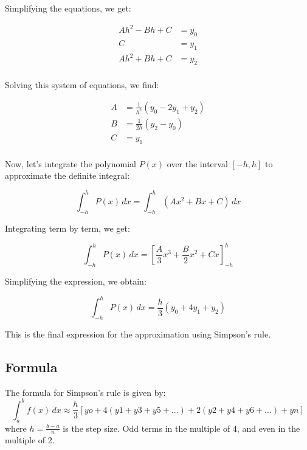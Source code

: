\documentclass[a4paper]{article}
\begin{document}
Simplifying the equations, we get:

\[
\begin{aligned}
Ah^2 - Bh + C &= y_0 \\
C &= y_1 \\
Ah^2 + Bh + C &= y_2 \\
\end{aligned}
\]

Solving this system of equations, we find:

\[
\begin{aligned}
A &= \frac{1}{h^2}(y_0 - 2y_1 + y_2) \\
B &= \frac{1}{2h}(y_2 - y_0) \\
C &= y_1 \\
\end{aligned}
\]

Now, let's integrate the polynomial $P(x)$ over the interval $[-h, h]$ to approximate the definite integral:

\[
\int_{-h}^{h} P(x) \, dx = \int_{-h}^{h} (Ax^2 + Bx + C) \, dx
\]

Integrating term by term, we get:

\[
\int_{-h}^{h} P(x) \, dx = \left[\frac{A}{3}x^3 + \frac{B}{2}x^2 + Cx \right]_{-h}^{h}
\]

Simplifying the expression, we obtain:

\[
\int_{-h}^{h} P(x) \, dx = \frac{h}{3}(y_0 + 4y_1 + y_2)
\]

This is the final expression for the approximation using Simpson's rule.


















\subsection{Formula}
The formula for Simpson's rule is given by:
\[
\int_{a}^{b} f(x) \, dx \approx \frac{h}{3} \left[ yo + 4(y1+y3+y5+ ...) + 2(y2+y4+y6+ ...) + yn \right]
\]
where $h = \frac{b - a}{n}$ is the step size.
Odd terms in the multiple of 4, and even in the multiple of 2.
\end{document}

